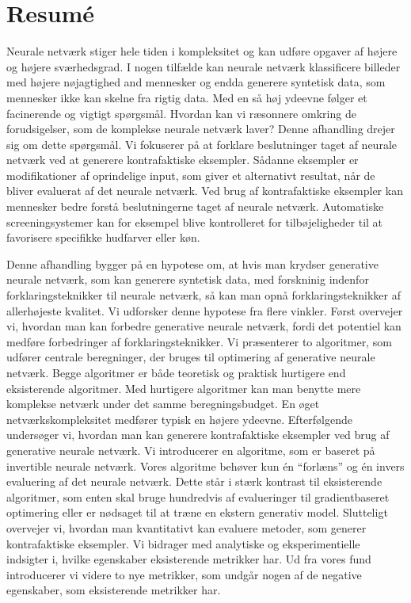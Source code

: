 \documentclass[11pt,a4paper,twoside,openright,final]{memoir}
\begin{document}
\cleardoublepage
\chapter*{{\Huge Resum\'e}}

Neurale netværk stiger hele tiden i kompleksitet og kan udføre opgaver af h\o jere og h\o jere sværhedsgrad.
I nogen tilfælde kan neurale netværk klassificere billeder med højere nøjagtighed and mennesker og endda generere syntetisk data, som mennesker ikke kan skelne fra rigtig data.
Med en så høj ydeevne følger et facinerende og vigtigt spørgsmål. 
Hvordan kan vi ræsonnere omkring de forudsigelser, som de komplekse neurale netværk laver?
Denne afhandling drejer sig om dette spørgsmål.
Vi fokuserer på at forklare beslutninger taget af neurale netværk ved at generere kontrafaktiske eksempler.
Sådanne eksempler er modifikationer af oprindelige input, som giver et alternativt resultat, når de bliver evaluerat af det neurale netværk.
Ved brug af kontrafaktiske eksempler kan mennesker bedre forstå beslutningerne taget af neurale netværk.
Automatiske screeningsystemer kan for eksempel blive kontrolleret for tilbøjeligheder til at favorisere specifikke hudfarver eller køn.

Denne afhandling bygger på en hypotese om, at hvis man krydser generative neurale netværk, som kan generere syntetisk data, med forskninig indenfor forklaringsteknikker til neurale netværk, så kan man opnå forklaringsteknikker af allerhøjeste kvalitet.
Vi udforsker denne hypotese fra flere vinkler.
Først overvejer vi, hvordan man kan forbedre generative neurale netværk, fordi det potentiel kan medføre forbedringer af forklaringsteknikker. 
Vi præsenterer to algoritmer, som udfører centrale beregninger, der bruges til optimering af generative neurale netværk.
Begge algoritmer er både teoretisk og praktisk hurtigere end eksisterende algoritmer.
Med hurtigere algoritmer kan man benytte mere komplekse netværk under det samme beregningsbudget.
En øget netværkskompleksitet medfører typisk en højere ydeevne.
Efterfølgende undersøger vi, hvordan man kan generere kontrafaktiske eksempler ved brug af generative neurale netværk.
Vi introducerer en algoritme, som er baseret på invertible neurale netværk.
Vores algoritme behøver kun \'en ``forlæns'' og \'en invers evaluering af det neurale netværk.
Dette står i stærk kontrast til eksisterende algoritmer, som enten skal bruge hundredvis af evalueringer til gradientbaseret optimering eller er nødsaget til at træne en ekstern generativ model.
Slutteligt overvejer vi, hvordan man kvantitativt kan evaluere metoder, som generer kontrafaktiske eksempler.
Vi bidrager med analytiske og eksperimentielle indsigter i, hvilke egenskaber  eksisterende metrikker har.
Ud fra vores fund introducerer vi videre to nye metrikker, som undgår nogen af de negative egenskaber, som eksisterende metrikker har.
\end{document}
